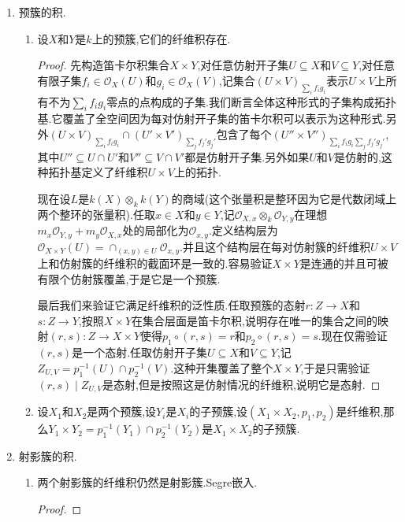 \begin{enumerate}
\begin{enumerate}
\begin{proof}
			只要说明$R\otimes_kS$中的全部在$(x,y)$处取零的元构成的理想恰好就是$m_x\mathscr{O}_{Y,y}+m_y\mathscr{O}_{X,x}$:一方面这里的元自然在$(x,y)$处取零;另一方面任取$h=\sum_if_i(X)g_i(Y)$使得它在$(x,y)$处取零,记$f_i(x)=a_i$和$g_i(y)=b_i$,那么$\sum_ia_ib_i=0$,于是$h$落在这个理想中:
			$$\sum_if_i(X)g_i(Y)=\sum_if_i(X)g_i(Y)-\sum_ia_ib_i=\sum_i(f_i(X)-a_i)g_i(Y)+\sum_ia_i(g_i(Y)-b_i)\in m_x\mathscr{O}_{Y,y}+m_y\mathscr{O}_{X,x}$$
		\end{proof}
		\item $\mathbb{A}^m_k$和$\mathbb{A}^n_k$的积就是$\mathbb{A}^{m+n}_k$.这件事说明尽管仿射簇的积在集合层面是笛卡尔积,它在拓扑层面不是积.
	\end{enumerate}
	\item 预簇的积.
	\begin{enumerate}
		\item 设$X$和$Y$是$k$上的预簇,它们的纤维积存在.
		\begin{proof}
			
			先构造笛卡尔积集合$X\times Y$,对任意仿射开子集$U\subseteq X$和$V\subseteq Y$,对任意有限子集$f_i\in\mathscr{O}_X(U)$和$g_i\in\mathscr{O}_X(V)$,记集合$(U\times V)_{\sum_if_ig_i}$表示$U\times V$上所有不为$\sum_if_ig_i$零点的点构成的子集.我们断言全体这种形式的子集构成拓扑基.它覆盖了全空间因为每对仿射开子集的笛卡尔积可以表示为这种形式.另外$(U\times V)_{\sum_if_ig_i}\cap(U'\times V')_{\sum_jf_j'g_j'}$包含了每个$(U''\times V'')_{\sum_if_ig_i\sum_jf_j'g_j'}$,其中$U''\subseteq U\cap U'$和$V''\subseteq V\cap V'$都是仿射开子集.另外如果$U$和$V$是仿射的,这种拓扑基定义了纤维积$U\times V$上的拓扑.
			
			现在设$L$是$k(X)\otimes_kk(Y)$的商域(这个张量积是整环因为它是代数闭域上两个整环的张量积).任取$x\in X$和$y\in Y$,记$\mathscr{O}_{X,x}\otimes_k\mathscr{O}_{Y,y}$在理想$m_x\mathscr{O}_{Y,y}+m_y\mathscr{O}_{X,x}$处的局部化为$\mathscr{O}_{x,y}$.定义结构层为$\mathscr{O}_{X\times Y}(U)=\cap_{(x,y)\in U}\mathscr{O}_{x,y}$.并且这个结构层在每对仿射簇的纤维积$U\times V$上和仿射簇的纤维积的截面环是一致的.容易验证$X\times Y$是连通的并且可被有限个仿射簇覆盖,于是它是一个预簇.
			
			最后我们来验证它满足纤维积的泛性质.任取预簇的态射$r:Z\to X$和$s:Z\to Y$,按照$X\times Y$在集合层面是笛卡尔积,说明存在唯一的集合之间的映射$(r,s):Z\to X\times Y$使得$p_1\circ(r,s)=r$和$p_2\circ(r,s)=s$.现在仅需验证$(r,s)$是一个态射.任取仿射开子集$U\subseteq X$和$V\subseteq Y$,记$Z_{U,V}=p_1^{-1}(U)\cap p_2^{-1}(V)$.这种开集覆盖了整个$X\times Y$,于是只需验证$(r,s)\mid Z_{U,V}$是态射,但是按照这是仿射情况的纤维积,说明它是态射.
		\end{proof}
		\item 设$X_1$和$X_2$是两个预簇,设$Y_i$是$X_i$的子预簇,设$(X_1\times X_2,p_1,p_2)$是纤维积,那么$Y_1\times Y_2=p_1^{-1}(Y_1)\cap p_2^{-1}(Y_2)$是$X_1\times X_2$的子预簇.
	\end{enumerate}
	\item 射影簇的积.
	\begin{enumerate}
		\item 两个射影簇的纤维积仍然是射影簇.Segre嵌入.
		\begin{proof}
			

\end{proof}
\end{enumerate}
\end{enumerate}
